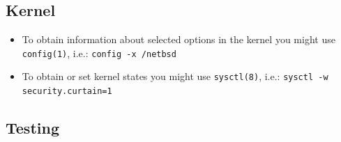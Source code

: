 \documentclass[notumble]{leaflet}
\newcommand{\man}[1]{\mbox{\texttt{#1}}}
\begin{document}
\subsection{Kernel}
\begin{itemize}
\item To obtain information about selected options in the kernel you might use 
\man{config(1)}, i.e.: \verb|config -x /netbsd|
\item To obtain or set kernel states you might use
\man{sysctl(8)}, i.e.: \verb|sysctl -w security.curtain=1|
\end{itemize}
\subsection{Testing}
\end{document}
